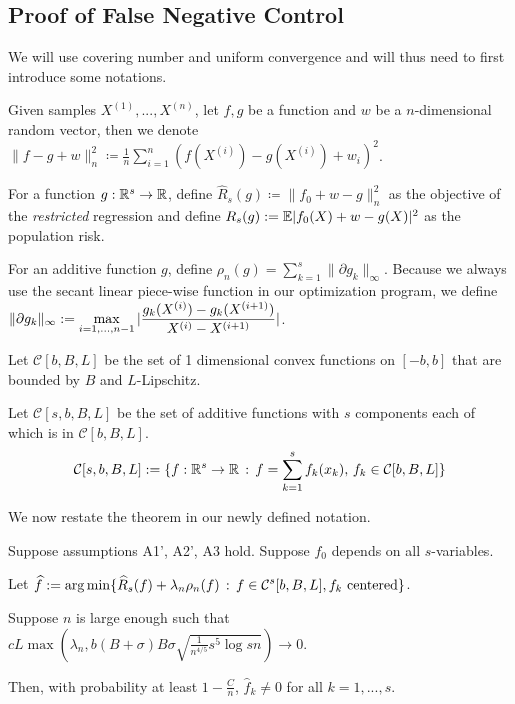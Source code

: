  
 
 
 
 
 \subsection{Proof of False Negative Control}
 \label{sec:false_negative_proof}
 
 We will use covering number and uniform convergence and will thus need to first introduce some notations. 
 
 Given samples $X^{(1)},...,X^{(n)}$, let $f, g$ be a function and $w$ be a $n$-dimensional random vector, then we denote $\| f - g + w \|_n^2 \coloneqq \frac{1}{n} \sum_{i=1}^n ( f(X^{(i)}) - g(X^{(i)}) + w_i )^2$.

For a function $g : {\mathbb R}^s \rightarrow {\mathbb R}$, define $\hat{R}_s(g) \coloneqq \| f_0 + w - g \|_n^2$ as the objective of the \emph{restricted} regression and define $R_s(g) := {\mathbb E} | f_0(X)  + w - g(X) |^2$ as the population risk.

For an additive function $g$, define $\rho_n(g) = \sum_{k=1}^s \| \partial g_k \|_\infty$. Because we always use the secant linear piece-wise function in our optimization program, we define $\displaystyle \| \partial g_k\|_\infty := \max_{i=1,...,n-1} |\frac{ g_k(X^{(i)}) - g_k(X^{(i+1)})}{ X^{(i)} - X^{(i+1)}}|$.

Let $\mathcal{C}[b,B,L]$ be the set of 1 dimensional convex functions on $[-b,b]$ that are bounded by $B$ and $L$-Lipschitz.

Let $\mathcal{C}[s,b,B,L]$ be the set of additive functions with $s$ components each of which is in $\mathcal{C}[b,B,L]$. 
\[
\mathcal{C}[s,b,B,L] := \{ f : {\mathbb R}^s \rightarrow {\mathbb R} \,:\, f = \sum_{k=1}^s f_k(x_k), \, f_k \in \mathcal{C}[b,B,L] \}
\]
 

We now restate the theorem in our newly defined notation.
 
\begin{theorem} 
Suppose assumptions A1', A2', A3 hold. Suppose $f_0$ depends on all $s$-variables. 

Let $\displaystyle \widehat{f} := \arg\min \{ \widehat{R}_s(f) + \lambda_n \rho_n(f) \,:\, f \in \mathcal{C}^s[b,B,L], f_k \textrm{ centered} \}$.

Suppose $n$ is large enough such that $c L \max \left(\lambda_n, b (B+\sigma)B\sigma \sqrt{\frac{1}{n^{4/5}} s^5 \log sn} \right) \rightarrow 0$.

Then, with probability at least $1-\frac{C}{n}$, $\hat{f}_k \neq 0$ for all $k =1,...,s$.
\end{theorem}

